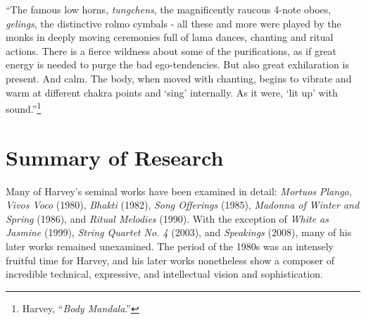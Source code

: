 ``The famous low horns, \emph{tungchens}, the magnificently raucous 4-note oboes, \emph{gelings}, the distinctive rolmo cymbals - all these and more were played by the monks in deeply moving ceremonies full of lama dances, chanting and ritual actions. There is a fierce wildness about some of the purifications, as if great energy is needed to purge the bad ego-tendencies. But also great exhilaration is present. And calm. The body, when moved with chanting, begins to vibrate and warm at different chakra points and `sing' internally. As it were, `lit up' with sound.''\footnote{Harvey, ``\emph{Body Mandala}.'' }

\section{Summary of Research}\label{summary-of-research}

Many of Harvey's seminal works have been examined in detail: \emph{Mortuos Plango, Vivos Voco} (1980), \emph{Bhakti} (1982), \emph{Song Offerings} (1985), \emph{Madonna of Winter and Spring} (1986), and \emph{Ritual Melodies} (1990). With the exception of \emph{White as Jasmine} (1999), \emph{String Quartet No. 4} (2003), and \emph{Speakings} (2008), many of his later works remained unexamined. The period of the 1980s was an intensely fruitful time for Harvey, and his later works nonetheless show a composer of incredible technical, expressive, and intellectual vision and sophistication.
